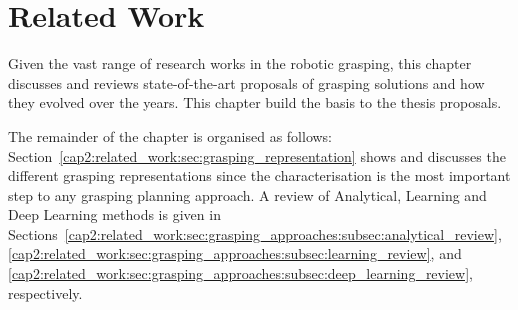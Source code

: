 \chapter{Related Work}
\label{cap2:related_work}

Given the vast range of research works in the robotic grasping, this chapter discusses and reviews state-of-the-art proposals of grasping solutions and how they evolved over the years. This chapter build the basis to the thesis proposals.



The remainder of the chapter is organised as follows: Section~\ref{cap2:related_work:sec:grasping_representation} shows and discusses the different grasping representations since the characterisation is the most important step to any grasping planning approach. A review of Analytical, Learning and Deep Learning methods is given in Sections~\ref{cap2:related_work:sec:grasping_approaches:subsec:analytical_review}, \ref{cap2:related_work:sec:grasping_approaches:subsec:learning_review}, and \ref{cap2:related_work:sec:grasping_approaches:subsec:deep_learning_review}, respectively.





